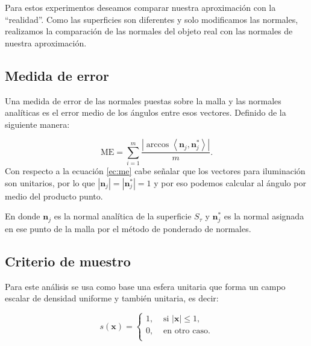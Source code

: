Para estos experimentos deseamos comparar nuestra aproximación con la ``realidad''. Como las superficies son diferentes y solo modificamos las normales, realizamos la comparación de las normales del objeto real con las normales de nuestra aproximación.

\subsection{Medida de error}
Una medida de error de las normales puestas sobre la malla y las normales analíticas es el error medio de los ángulos entre esos vectores. Definido de la siguiente manera:

\begin{equation}
  \text{ME} = \sum \limits_{i = 1}^{m} \frac{|\arccos \left\langle \textbf{n}_{j}, \textbf{n}^{*}_{j} \right\rangle |}{m}.
  \label{ec:me}
\end{equation}
Con respecto a la ecuación \eqref{ec:me} cabe señalar que los vectores para iluminación son unitarios, por lo que $|\textbf{n}_{j}| = |\textbf{n}^{*}_{j}| = 1$ y por eso podemos calcular al ángulo por medio del producto punto.

En donde $\textbf{n}_{j}$ es la normal analítica de la superficie $S_\tau$ y $\textbf{n}^{*}_{j}$ es la normal asignada en ese punto de la malla por el método de ponderado de normales.

\subsection{Criterio de muestro}

Para este análisis se usa como base una esfera unitaria que forma un campo escalar de densidad uniforme y también unitaria, es decir: 

\begin{equation}
  s(\textbf{x}) = 
    \begin{cases} 
      1, & \text{ si } |\textbf{x}| \leq 1, \\
      0, & \text{ en otro caso.} \\                                
    \end{cases}
\label{ec:sphere}
\end{equation}

